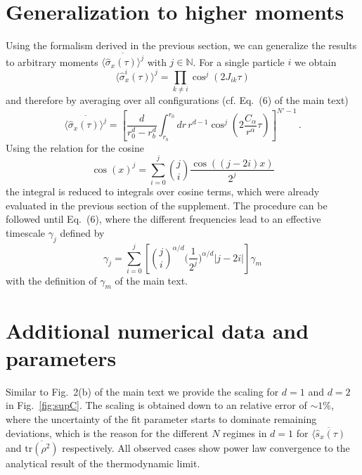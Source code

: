 \documentclass[aps,twocolumn,
superscriptaddress,
footinbib,
prl]{revtex4-1}
\begin{document}
\section{Generalization to higher moments}
Using the formalism derived in the previous section, we can generalize the results to arbitrary moments $\overline{\langle \hat{\sigma}_x(\tau) \rangle^j}$ with $j \in \mathbb{N} $. For a single particle $i$ we obtain 
\begin{equation}
        \langle\hat{\sigma}_x^i(\tau)\rangle^j = \prod_{k\neq i}\cos^j(2J_{ik}\tau)
\end{equation}
and therefore by averaging over all configurations (cf. Eq.~(6) of the main text)
\begin{equation}
    \overline{\langle \hat{\sigma}_x(\tau) \rangle^j} = \left[\frac{d}{r_0^d - r_b^d} \int_{r_b}^{r_0} dr\, r^{d-1} \cos^j\left(2\frac{ C_\alpha}{r^{\alpha}} \tau\right)\right]^{N'-1} \,.
\end{equation}
Using the relation for the cosine 
\begin{equation}
    \cos(x)^j = \sum_{i=0}^j \binom{j}{i}\frac{\cos{((j-2i)x)}}{2^j}
\end{equation}
the integral is reduced to integrals over cosine terms, which were already evaluated in the previous section of the supplement. The procedure can be followed until Eq.~(6), where the different frequencies lead to an effective timescale $\gamma_j$ defined by 
\begin{equation}
    \gamma_j= \sum_{i=0}^j \left[ \binom{j}{i}^{\alpha/d }\Big(\frac{1}{2^j}\Big)^{\alpha/d}     |j-2i| \right]\gamma_m
\end{equation}
with the definition of $\gamma_m$ of the main text. 

\section{Additional numerical data and parameters}
\label{supB}


\label{supC}
Similar to Fig.~2(b) of the main text we provide the scaling for $d=1$ and $d=2$ in Fig.~\ref{fig:supC}. The scaling is obtained down to an relative error of $\sim 1 \%$, where the uncertainty of the fit parameter starts to dominate remaining deviations, which is the reason for the different $N$ regimes in $d=1$ for $\overline{\langle \hat{s}_x(\tau)}$ and $\overline{\mathrm{tr}(\rho^{2})}$ respectively. All observed cases show power law convergence to the analytical result of the thermodynamic limit. 
\end{document}
